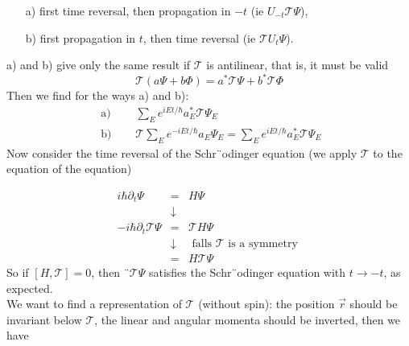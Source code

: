 \begin{enumerate}
    \item[a)] first time reversal, then propagation in $-t$ (ie $U_{-t}\mathcal{T}\Psi$),
    \item[b)] first propagation in $t$, then time reversal (ie $\mathcal{T}U_t\Psi$).
\end{enumerate}
a) and b) give only the same result if $\mathcal{T}$ is antilinear, that is, it must be valid
\begin{equation}
    \mathcal{T}(a \Psi+b \Phi)=a^{*} \mathcal{T} \Psi+b^{*} \mathcal{T} \Phi
    \end{equation}
Then we find for the ways a) and b):
\begin{align}
    \text { a) } & \quad \sum_{E} e^{i E t / \hbar} a_{E}^{*} \mathcal{T} \Psi_{E}\nonumber\\
    \text { b) } & \quad \mathcal{T} \sum_{E} e^{-i E t / \hbar} a_{E} \Psi_{E}=\sum_{E} e^{i E t / \hbar} a_{E}^{*} \mathcal{T} \Psi_{E}
\end{align}
Now consider the time reversal of the Schr¨odinger equation (we apply $\mathcal{T}$ to the equation of the equation)

\begin{equation}
\begin{array}{rcl} 
    i \hbar \partial_{t} \Psi &=&H \Psi \\
    &\downarrow&\\
    -i \hbar \partial_{t} \mathcal{T} \Psi &=&\mathcal{T} H \Psi \\ 
    & \downarrow& \text { falls } \mathcal{T} \text { is a symmetry } \\ 
    &=&H \mathcal{T} \Psi \end{array}
\end{equation}
So if $[H, \mathcal{T}] = 0$, then ¨$\mathcal{T}\Psi$ satisfies the Schr¨odinger equation with $t \rightarrow -t$, as expected.
\\
We want to find a representation of $\mathcal{T}$ (without spin): the position $\vec{r}$ should be invariant below $\mathcal{T}$, the linear and angular momenta should be inverted, then we have


